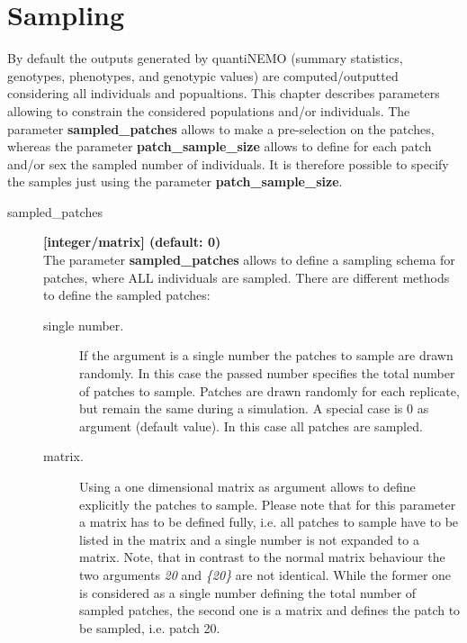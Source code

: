\documentclass[letterpaper,12pt,oneside]{book}
\begin{document}
\section{Sampling}\label{sec:sampling}
By default the outputs generated by quantiNEMO (summary statistics, genotypes, phenotypes, and genotypic values) are computed/outputted considering all individuals and popualtions. This chapter describes parameters allowing to constrain the considered populations and/or individuals. The parameter \textbf{sampled\_patches} allows to make a pre-selection on the patches, whereas the parameter \textbf{patch\_sample\_size} allows to define for each patch and/or sex the sampled number of individuals. It is therefore possible to specify the samples just using the parameter \textbf{patch\_sample\_size}.
 
\begin{description}
\item[sampled\_patches] \textbf{[integer/matrix] (default: 0)}\\ 
The parameter \textbf{sampled\_patches} allows to define a sampling schema for patches, where ALL individuals are sampled. There are different methods to define the sampled patches:
\begin{description}
\item[single number.] If the argument is a single number the patches to sample are drawn randomly. In this case the passed number specifies the total number of patches to sample. Patches are drawn randomly for each replicate, but remain the same during a simulation. A special case is 0 as argument (default value). In this case all patches are sampled. 
\item[matrix.] Using a one dimensional matrix as argument allows to define explicitly the patches to sample. Please note that for this parameter a matrix has to be defined fully, i.e. all patches to sample have to be listed in the matrix and a single number is not expanded to a matrix. Note, that in contrast to the normal matrix behaviour the two arguments \textit{20} and \textit{\{20\}} are not identical. While the former one is considered as a single number defining the total number of sampled patches, the second one is a matrix and defines the patch to be sampled, i.e. patch 20.  
\end{description}


\end{description}
\end{document}
